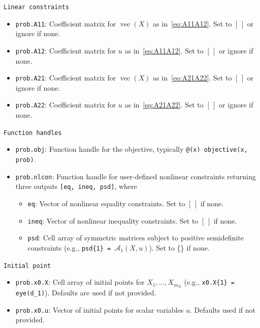 \documentclass[]{interact}
\newcommand{\vect}{\operatorname{vec}}
\theoremstyle{plain}%
\theoremstyle{definition}
\theoremstyle{remark}
\begin{document}
\texttt{Linear constraints}

    \begin{itemize}
    \item \texttt{prob.A11}: Coefficient matrix for \(\vect(X)\) as in~\eqref{eq:A11A12}. Set to \([\,]\) or ignore if none.
    \item \texttt{prob.A12}: Coefficient matrix for \(u\) as in~\eqref{eq:A11A12}. Set to \([\,]\) or ignore if none.
    \item \texttt{prob.A21}: Coefficient matrix for \(\vect(X)\) as in~\eqref{eq:A21A22}. Set to \([\,]\) or ignore if none.
    \item \texttt{prob.A22}: Coefficient matrix for \(u\) as in~\eqref{eq:A21A22}. Set to \([\,]\) or ignore if none.
        \end{itemize}

\texttt{Function handles}

    \begin{itemize}
    \item \texttt{prob.obj}: Function handle for the objective, typically \texttt{@(x) objective(x, prob)}.
    \item \texttt{prob.nlcon}: Function handle for user-defined nonlinear constraints returning three outputs \texttt{[eq, ineq, psd]}, where
    \begin{itemize}
        \item \texttt{eq}: Vector of nonlinear equality constraints. Set to \([\,]\)  if none.
        \item \texttt{ineq}: Vector of nonlinear inequality constraints. Set to \([\,]\)  if none.
        \item \texttt{psd}: Cell array of symmetric matrices subject to positive semidefinite constraints (e.g., \texttt{psd\{1\} = $\mathcal{A}_1(X,u)$}). Set to \{\} if none.

    \end{itemize}
        \end{itemize}

\texttt{Initial point}

    \begin{itemize}
    \item \texttt{prob.x0.X}: Cell array of initial points for \(X_1, \dots, X_{m_X}\) (e.g., \texttt{x0.X\{1\} = eye(d\_1)}). Defaults are used if not provided.
    \item \texttt{prob.x0.u}: Vector of initial points for scalar variables \(u\). Defaults used if not provided.
\end{itemize}
\end{document}
